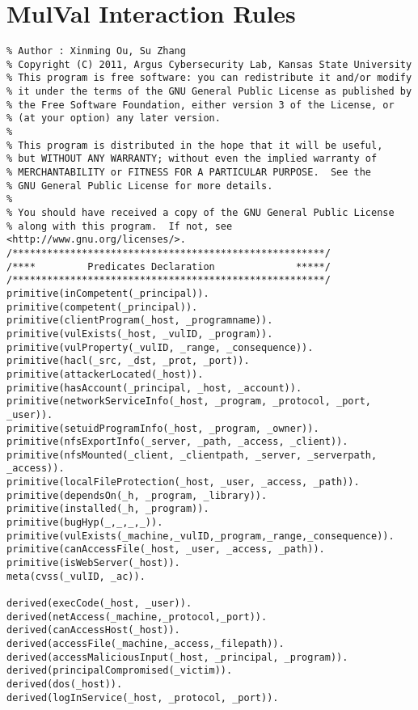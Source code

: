\chapter{MulVal Interaction Rules} \label{app:mulval}

\begin{lstlisting}[style=datalog, label={lst:mulval_primitives}, caption={Mulval Primitive and Derived Facts}]
% MulVAL interaction rules
% Author : Xinming Ou, Su Zhang
% Copyright (C) 2011, Argus Cybersecurity Lab, Kansas State University
% This program is free software: you can redistribute it and/or modify
% it under the terms of the GNU General Public License as published by
% the Free Software Foundation, either version 3 of the License, or
% (at your option) any later version.
% 
% This program is distributed in the hope that it will be useful,
% but WITHOUT ANY WARRANTY; without even the implied warranty of
% MERCHANTABILITY or FITNESS FOR A PARTICULAR PURPOSE.  See the
% GNU General Public License for more details.
% 
% You should have received a copy of the GNU General Public License
% along with this program.  If not, see <http://www.gnu.org/licenses/>.
/******************************************************/
/****         Predicates Declaration              *****/
/******************************************************/
primitive(inCompetent(_principal)).
primitive(competent(_principal)).
primitive(clientProgram(_host, _programname)).
primitive(vulExists(_host, _vulID, _program)).
primitive(vulProperty(_vulID, _range, _consequence)).
primitive(hacl(_src, _dst, _prot, _port)).
primitive(attackerLocated(_host)).
primitive(hasAccount(_principal, _host, _account)).
primitive(networkServiceInfo(_host, _program, _protocol, _port, _user)).
primitive(setuidProgramInfo(_host, _program, _owner)).
primitive(nfsExportInfo(_server, _path, _access, _client)).
primitive(nfsMounted(_client, _clientpath, _server, _serverpath, _access)).
primitive(localFileProtection(_host, _user, _access, _path)).
primitive(dependsOn(_h, _program, _library)).
primitive(installed(_h, _program)).
primitive(bugHyp(_,_,_,_)).
primitive(vulExists(_machine,_vulID,_program,_range,_consequence)).
primitive(canAccessFile(_host, _user, _access, _path)).
primitive(isWebServer(_host)).
meta(cvss(_vulID, _ac)).

derived(execCode(_host, _user)).
derived(netAccess(_machine,_protocol,_port)).
derived(canAccessHost(_host)).
derived(accessFile(_machine,_access,_filepath)).
derived(accessMaliciousInput(_host, _principal, _program)).
derived(principalCompromised(_victim)).
derived(dos(_host)).
derived(logInService(_host, _protocol, _port)).


\end{lstlisting}
